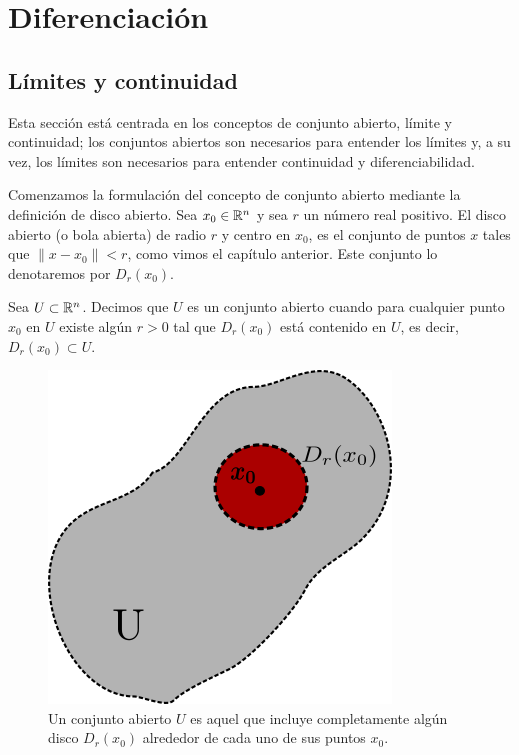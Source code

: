 \chapter{Diferenciación}\label{ch:diferenciacion}
\section{Límites y continuidad}

Esta sección está centrada en los conceptos de conjunto abierto, límite y continuidad; los conjuntos abiertos son necesarios para entender los límites y, a su vez, los límites son necesarios para entender continuidad y diferenciabilidad.

Comenzamos la formulación del concepto de conjunto abierto mediante la definición de disco abierto. Sea $x_{0}
\in  \mathbb{R}^{n}$ y sea $r$ un número real positivo. El disco abierto (o bola abierta) de radio $r$ y centro 
en $x_{0}$, es el conjunto de puntos $x$ tales que $\|x-x_{0}\| < r $, como vimos el capítulo anterior. Este 
conjunto lo denotaremos por $D_{r}(x_{0})$.

\begin{definition}
    Sea $U \subset \mathbb{R}^{n}$. Decimos que $U$ es un conjunto abierto cuando para cualquier punto $x_{0}$ en $U$ existe algún $r>0$
    tal que $D_{r}(x_{0})$ está contenido en $U$, es decir, $D_{r}(x_{0}) \subset U$.
\end{definition}

\begin{figure}[!ht]
  \begin{center}
      \includegraphics[width=0.5\linewidth]{gfx/conjunto-abierto}
      \caption{Un conjunto abierto $U$ es aquel que incluye completamente algún disco $D_{r}(x_{0})$ alrededor
      de cada uno de sus puntos $x_{0}$.}
      \label{fig:boat1}
  \end{center}
\end{figure}

